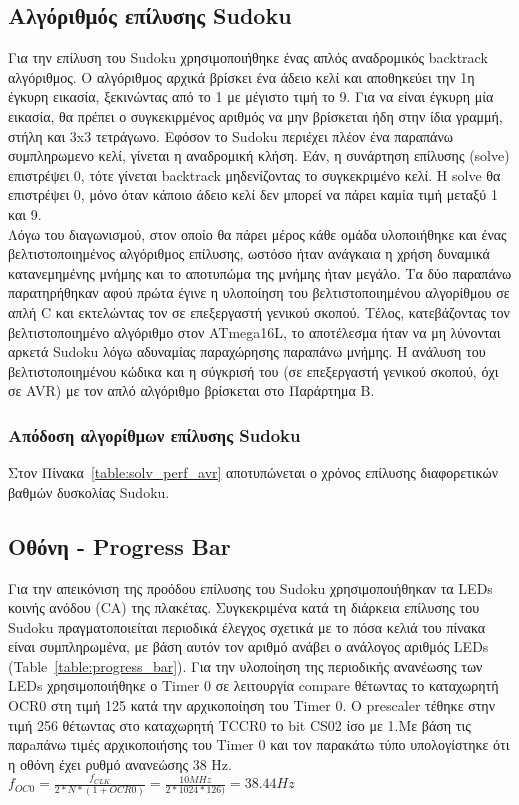 \documentclass[a4paper,12pt]{article}
\begin{document}
\subsection{Αλγόριθμός επίλυσης Sudoku}
Για την επίλυση του Sudoku χρησιμοποιήθηκε ένας απλός αναδρομικός backtrack αλγόριθμος. Ο αλγόριθμος αρχικά βρίσκει ένα άδειο κελί και αποθηκεύει την 1η έγκυρη εικασία, ξεκινώντας από το 1 με μέγιστο τιμή το 9. Για να είναι έγκυρη μία εικασία, θα πρέπει ο συγκεκιρμένος αριθμός να μην βρίσκεται ήδη στην ίδια γραμμή, στήλη και 3x3 τετράγωνο. Εφόσον το Sudoku περιέχει πλέον ένα παραπάνω συμπληρωμενο κελί, γίνεται η αναδρομική κλήση. Εάν, η συνάρτηση επίλυσης (solve) επιστρέψει 0, τότε γίνεται backtrack μηδενίζοντας το συγκεκριμένο κελί. Η solve θα επιστρέψει 0, μόνο όταν κάποιο άδειο κελί δεν μπορεί να πάρει καμία τιμή μεταξύ 1 και 9.\\
Λόγω του διαγωνισμού, στον οποίο θα πάρει μέρος κάθε ομάδα υλοποιήθηκε και ένας βελτιστοποιημένος αλγόριθμος επίλυσης, ωστόσο ήταν ανάγκαια η χρήση δυναμικά κατανεμημένης μνήμης και το αποτυπώμα της μνήμης ήταν μεγάλο. Τα δύο παραπάνω παρατηρήθηκαν αφού πρώτα έγινε η υλοποίηση του βελτιστοποιημένου αλγορίθμου σε απλή C και εκτελώντας τον σε επεξεργαστή γενικού σκοπού. Τέλος, κατεβάζοντας τον βελτιστοποιημένο αλγόριθμο στον ATmega16L, το αποτέλεσμα ήταν να μη λύνονται αρκετά Sudoku λόγω αδυναμίας παραχώρησης παραπάνω μνήμης. Η ανάλυση του βελτιστοποιημένου κώδικα και η σύγκρισή του (σε επεξεργαστή γενικού σκοπού, όχι σε AVR) με τον απλό αλγόριθμο βρίσκεται στο Παράρτημα Β.\\


\subsubsection{Απόδοση αλγορίθμων επίλυσης Sudoku}
Στον Πίνακα~\ref{table:solv_perf_avr} αποτυπώνεται ο χρόνος επίλυσης διαφορετικών βαθμών δυσκολίας Sudoku.


\subsection{Οθόνη - Progress Bar}
Για την απεικόνιση της προόδου επίλυσης του Sudoku χρησιμοποιήθηκαν τα LEDs κοινής ανόδου (CA) της πλακέτας. Συγκεκριμένα κατά τη διάρκεια επίλυσης του Sudoku πραγματοποιείται περιοδικά έλεγχος σχετικά με το πόσα κελιά του πίνακα είναι συμπληρωμένα, με βάση αυτόν τον αριθμό ανάβει ο ανάλογος αριθμός LEDs (Table~\ref{table:progress_bar}).
Για την υλοποίηση της περιοδικής ανανέωσης των LEDs χρησιμοποιήθηκε ο Timer 0 σε λειτουργία compare θέτωντας το καταχωρητή OCR0 στη τιμή 125 κατά την αρχικοποίηση του Timer 0. Ο prescaler τέθηκε στην τιμή 256 θέτωντας στο καταχωρητή TCCR0 το bit CS02 ίσο με 1.Με βάση τις παρaπάνω τιμές αρχικοποιήσης του Timer 0 και τον παρακάτω τύπο υπολογίστηκε ότι η οθόνη έχει ρυθμό ανανεώσης 38 Hz.\\
$f_{OC0} = \frac{f_{CLK}}{2*N*(1+OCR0)} = \frac{10 MHz}{2*1024*126)} = 38.44 Hz$ \\
\end{document}
